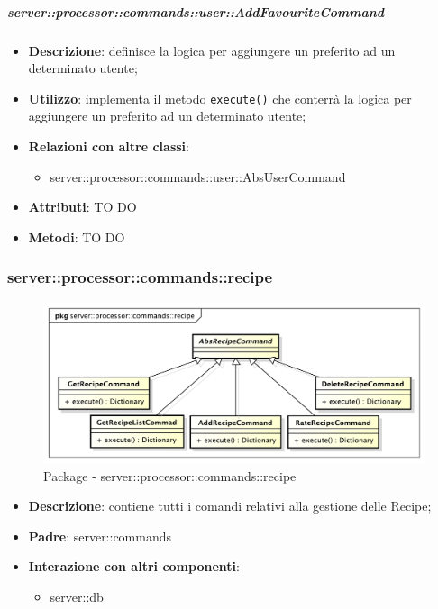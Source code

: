         \subparagraph{server::processor::commands::user::AddFavouriteCommand} %
        \label{subp:bdsm_app_server_processor_commands_user_addfavouritecommand}
        \begin{itemize}
          \item \textbf{Descrizione}: definisce la logica per aggiungere un preferito ad un determinato utente;
          \item \textbf{Utilizzo}: implementa il metodo \texttt{execute()} che conterrà la logica per aggiungere un preferito ad un determinato utente;
          \item \textbf{Relazioni con altre classi}:
            \begin{itemize}
              \item server::processor::commands::user::AbsUserCommand
            \end{itemize}
			\item \textbf{Attributi}: TO DO
			\item \textbf{Metodi}: TO DO
        \end{itemize}


      \subsubsection{server::processor::commands::recipe} %
      \label{ssub:bdsm_app_server_processor_commands_recipe}
      \begin{figure}[!htbp]
      	\centering
      	\centerline{\includegraphics[scale=0.5]{./images/server/recipe.pdf}}
      	\caption{Package - server::processor::commands::recipe}
      \end{figure}

      \begin{itemize}
        \item \textbf{Descrizione}: contiene tutti i comandi relativi alla gestione delle Recipe;
        \item \textbf{Padre}: server::commands
        \item \textbf{Interazione con altri componenti}:
          \begin{itemize}
            \item server::db
          \end{itemize}
      \end{itemize}

